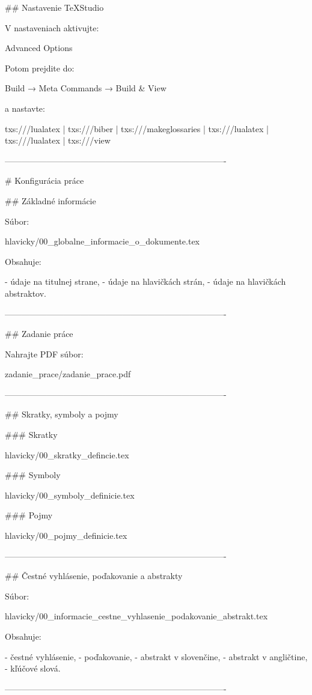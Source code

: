 ## Nastavenie TeXStudio

V nastaveniach aktivujte:

Advanced Options

Potom prejdite do:

Build → Meta Commands → Build & View

a nastavte:

txs:///lualatex |
txs:///biber |
txs:///makeglossaries |
txs:///lualatex |
txs:///lualatex |
txs:///view

-------------------------------------------------------------------------------

# Konfigurácia práce

## Základné informácie

Súbor:

hlavicky/00_globalne_informacie_o_dokumente.tex

Obsahuje:

- údaje na titulnej strane,
- údaje na hlavičkách strán,
- údaje na hlavičkách abstraktov.

-------------------------------------------------------------------------------

## Zadanie práce

Nahrajte PDF súbor:

zadanie_prace/zadanie_prace.pdf

-------------------------------------------------------------------------------

## Skratky, symboly a pojmy

### Skratky

hlavicky/00_skratky_defincie.tex

### Symboly

hlavicky/00_symboly_definicie.tex

### Pojmy

hlavicky/00_pojmy_definicie.tex

-------------------------------------------------------------------------------

## Čestné vyhlásenie, poďakovanie a abstrakty

Súbor:

hlavicky/00_informacie_cestne_vyhlasenie_podakovanie_abstrakt.tex

Obsahuje:

- čestné vyhlásenie,
- poďakovanie,
- abstrakt v slovenčine,
- abstrakt v angličtine,
- kľúčové slová.

-------------------------------------------------------------------------------

